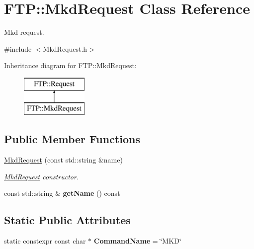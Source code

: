 \hypertarget{classFTP_1_1MkdRequest}{}\section{F\+T\+P\+:\+:Mkd\+Request Class Reference}
\label{classFTP_1_1MkdRequest}


Mkd request.  




{\ttfamily \#include $<$Mkd\+Request.\+h$>$}

Inheritance diagram for F\+T\+P\+:\+:Mkd\+Request\+:\begin{figure}[H]
\begin{center}
\leavevmode
\includegraphics[height=2.000000cm]{classFTP_1_1MkdRequest}
\end{center}
\end{figure}
\subsection*{Public Member Functions}
\begin{DoxyCompactItemize}
\item 
\hyperlink{classFTP_1_1MkdRequest_a1c4565a8d7fbe2bc74ac4db2e2f4d4a9}{Mkd\+Request} (const std\+::string \&name)
\begin{DoxyCompactList}\small\item\em \hyperlink{classFTP_1_1MkdRequest}{Mkd\+Request} constructor. \end{DoxyCompactList}\item 
\hypertarget{classFTP_1_1MkdRequest_ae113af9dc74d782f22f51108186ec388}{}const std\+::string \& {\bfseries get\+Name} () const \label{classFTP_1_1MkdRequest_ae113af9dc74d782f22f51108186ec388}

\end{DoxyCompactItemize}
\subsection*{Static Public Attributes}
\begin{DoxyCompactItemize}
\item 
\hypertarget{classFTP_1_1MkdRequest_a0a5ac61b458cd123dcbbaa97143e2221}{}static constexpr const char $\ast$ {\bfseries Command\+Name} = \char`\"{}M\+K\+D\char`\"{}\label{classFTP_1_1MkdRequest_a0a5ac61b458cd123dcbbaa97143e2221}

\end{DoxyCompactItemize}


